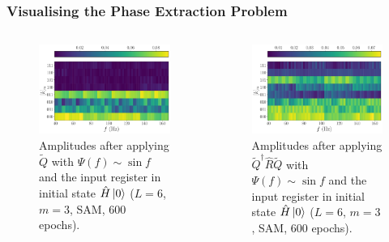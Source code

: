 \documentclass{beamer}
\begin{document}
\begin{frame}
\frametitle{Visualising the Phase Extraction Problem}
\begin{columns}
\begin{column}{0.5\textwidth}
\begin{figure}
\centering 
\includegraphics[width=\textwidth]{im/Q_amp_sine_H}
\caption{Amplitudes after applying $\tilde{Q}$ with $\Psi(f) \sim \sin f$ and the input register in initial state $\hat{H} \ket{0}$ ($L=6$, $m=3$, SAM, 600 epochs). }
\end{figure}
\end{column}
\begin{column}{0.5\textwidth}
\begin{figure}
\centering 
\includegraphics[width=\textwidth]{im/QRQ_amp_sine_H}
\caption{Amplitudes after applying $\tilde{Q}^\dagger \hat{R} \tilde{Q}$ with $\Psi(f) \sim \sin f$ and the input register in initial state $\hat{H} \ket{0}$ ($L=6$, $m=3$, SAM, 600 epochs). }
\end{figure}
\end{column}
\end{columns}
\end{frame}
\end{document}
